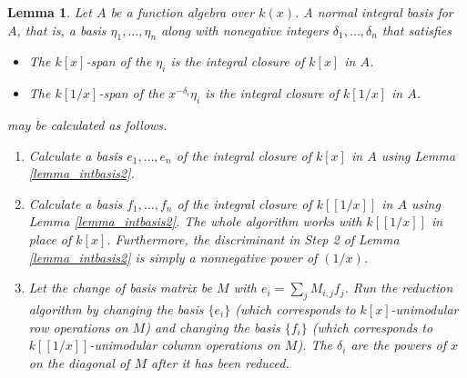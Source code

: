 \documentclass[12pt,reqno]{amsart}
\numberwithin{equation}{section}
\newtheorem{lemma}[theorem]{Lemma}
\begin{document}
\begin{lemma}
\label{lemma_intbasis}
 Let $A$ be a function algebra over $k(x)$. A normal integral basis for $A$, that is, a basis $\eta_1,\dots,\eta_n$ along with nonegative integers $\delta_1,\dots,\delta_n$ that satisfies
\begin{itemize}
 \item The $k[x]$-span of the $\eta_i$ is the integral closure of $k[x]$ in $A$.
 \item The $k[1/x]$-span of the $x^{-\delta_i} \eta_i$ is the integral closure of $k[1/x]$ in $A$.
\end{itemize}
may be calculated as follows.

\begin{enumerate}
 \item Calculate a basis $e_1,\dots,e_n$ of the integral closure of $k[x]$ in $A$ using Lemma \ref{lemma_intbasis2}.
 \item Calculate a basis $f_1,\dots,f_n$ of the integral closure of $k[[1/x]]$ in $A$ using Lemma \ref{lemma_intbasis2}. The whole algorithm works with $k[[1/x]]$ in place of $k[x]$. Furthermore, the discriminant in Step 2 of Lemma \ref{lemma_intbasis2} is simply a nonnegative power of $(1/x)$.
 \item Let the change of basis matrix be $M$ with $e_i = \sum_j M_{i,j} f_j$. Run the reduction algorithm by changing the basis $\{e_i\}$ (which corresponds to $k[x]$-unimodular row operations on $M$) and changing the basis $\{f_i\}$ (which corresponds to $k[[1/x]]$-unimodular column operations on $M$). The $\delta_i$ are the powers of $x$ on the diagonal of $M$ after it has been reduced.
\end{enumerate}
\end{lemma}
\end{document}
